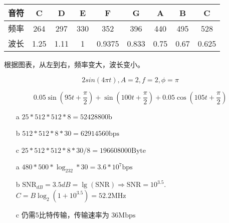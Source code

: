 \maketitle
\begin{nproblem}[3.4]
\end{nproblem}
\begin{nsolution}
\begin{table}[H]
    \begin{tabular}{c|cccccccc}
        音符 & C & D & E & F & G & A & B & C \\ \hline
        频率 & 264 & 297 & 330 & 352 & 396 & 440 & 495 & 528 \\
        波长 & 1.25 & 1.11 & 1 & 0.9375 & 0.833 & 0.75 & 0.67 & 0.625 \\
    \end{tabular}
\end{table}

根据图表，从左到右，频率变大，波长变小。
\end{nsolution}

\begin{nproblem}[3.5]
\end{nproblem}
\begin{nsolution}
    \[2sin(4\pi t),A=2,f=2,\phi=\pi\]
\end{nsolution}

\begin{nproblem}[3.6]
\end{nproblem}
\begin{nsolution}
    \[0.05\sin(95t+\frac{\pi}{2})+\sin(100t+\frac{\pi}{2})+0.05\cos(105t+\frac{\pi}{2})\]
\end{nsolution}

\begin{nproblem}[3.12]
\end{nproblem}
\begin{nsolution}
    \begin{itemize}
        \item[a] $25*512*512*8=52428800\text{b}$
        \item[b] $512*512*8*30=62914560\text{bps}$
        \item[c] $25*512*512*8*30/8=196608000\text{Byte}$  
    \end{itemize}
\end{nsolution}

\begin{nproblem}[3.13]
\end{nproblem}
\begin{nsolution}
    \begin{itemize}
        \item[a] $480*500*\log_232*30=3.6*10^7\text{bps}$
        \item[b] $\text{SNR}_{dB}=3.5dB=\lg(\text{SNR})\Rightarrow \text{SNR}=10^{3.5}$.
        $C=B\log_2(1+10^{3.5})= 52.2\text{MHz}$
        \item[c] 仍需5比特传输，传输速率为 $36\text{Mbps}$
    \end{itemize}
\end{nsolution}

